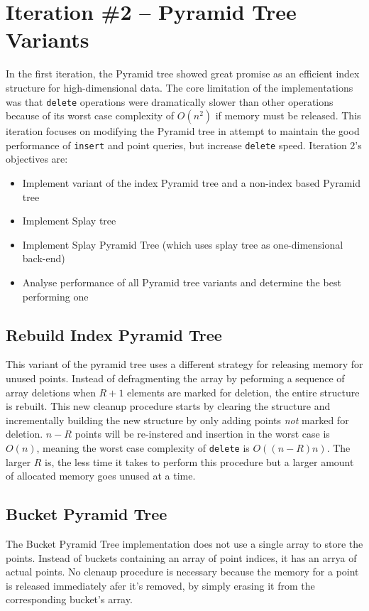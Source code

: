 \section{Iteration \#2 -- Pyramid Tree Variants}

In the first iteration, the Pyramid tree showed great promise as an efficient index structure for high-dimensional data. The core limitation of the implementations was that \texttt{delete} operations were dramatically slower than other operations because of its worst case complexity of $O(n^2)$ if memory must be released. This iteration focuses on modifying the Pyramid tree in attempt to maintain the good performance of \texttt{insert} and point queries, but increase \texttt{delete} speed. Iteration 2's objectives are:
\begin{itemize}
	\item Implement variant of the index Pyramid tree and a non-index based Pyramid tree
	\item Implement Splay tree
	\item Implement Splay Pyramid Tree (which uses splay tree as one-dimensional back-end)
	\item Analyse performance of all Pyramid tree variants and determine the best performing one
\end{itemize}

\subsection{Rebuild Index Pyramid Tree}

This variant of the pyramid tree uses a different strategy for releasing memory for unused points. Instead of defragmenting the array by peforming a sequence of array deletions when $R + 1$ elements are marked for deletion, the entire structure is rebuilt. This new cleanup procedure starts by clearing the structure and incrementally building the new structure by only adding points \textit{not} marked for deletion. $n - R$ points will be re-instered and insertion in the worst case is $O(n)$, meaning the worst case complexity of \texttt{delete} is $O((n - R)n)$. The larger $R$ is, the less time it takes to perform this procedure but a larger amount of allocated memory goes unused at a time.

\subsection{Bucket Pyramid Tree}

The Bucket Pyramid Tree implementation does not use a single array to store the points. Instead of buckets containing an array of point indices, it has an arrya of actual points. No clenaup procedure is necessary because the memory for a point is released immediately afer it's removed, by simply erasing it from the corresponding bucket's array.

